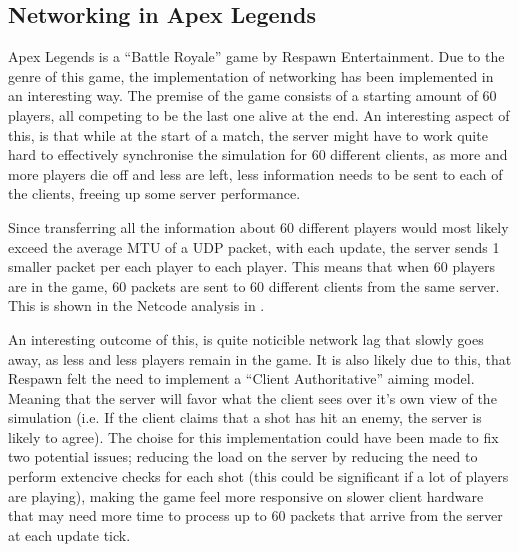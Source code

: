 \subsection{Networking in Apex Legends}
Apex Legends is a ``Battle Royale'' game by Respawn Entertainment. Due to the genre of this game, the implementation of networking has been implemented in an interesting way. The premise of the game consists of a starting amount of 60 players, all competing to be the last one alive at the end. An interesting aspect of this, is that while at the start of a match, the server might have to work quite hard to effectively synchronise the simulation for 60 different clients, as more and more players die off and less are left, less information needs to be sent to each of the clients, freeing up some server performance.

Since transferring all the information about 60 different players would most likely exceed the average MTU of a UDP packet, with each update, the server sends 1 smaller packet per each player to each player. This means that when 60 players are in the game, 60 packets are sent to 60 different clients from the same server. This is shown in the Netcode analysis in .

An interesting outcome of this, is quite noticible network lag that slowly goes away, as less and less players remain in the game. It is also likely due to this, that Respawn felt the need to implement a ``Client Authoritative'' aiming model. Meaning that the server will favor what the client sees over it's own view of the simulation (i.e. If the client claims that a shot has hit an enemy, the server is likely to agree). The choise for this implementation could have been made to fix two potential issues; reducing the load on the server by reducing the need to perform extencive checks for each shot (this could be significant if a lot of players are playing), making the game feel more responsive on slower client hardware that may need more time to process up to 60 packets that arrive from the server at each update tick.

